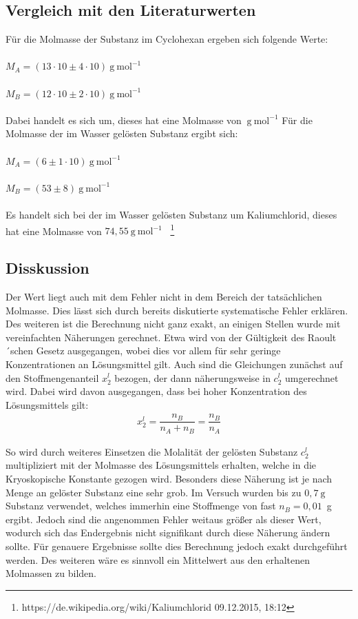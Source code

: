\documentclass[12pt,a4paper,titlepage,headinclude,bibtotoc]{scrartcl}
\begin{document}
\subsection{Vergleich mit den Literaturwerten}
Für die Molmasse der Substanz im Cyclohexan ergeben sich folgende Werte:\\\\
$M_A = (13 \cdot 10 \pm 4 \cdot 10){~} \mathrm{g{~}mol^{-1}}$\\\\
$M_B = (12 \cdot 10 \pm 2 \cdot 10){~} \mathrm{g{~}mol^{-1}}$\\\\
Dabei handelt es sich um, dieses hat eine Molmasse von ${~} \mathrm{g{~}mol^{-1}}$
Für die Molmasse der im Wasser gelösten Substanz ergibt sich:\\\\
$M_A = (6  \pm 1 \cdot 10){~} \mathrm{g{~}mol^{-1}}$\\\\
$M_B = (53 \pm 8 ){~} \mathrm{g{~}mol^{-1}}$\\\\
Es handelt sich bei der im Wasser gelösten Substanz um Kaliumchlorid, dieses hat eine Molmasse von $74,55{~} \mathrm{g{~}mol^{-1}}$ {~}\footnote{https://de.wikipedia.org/wiki/Kaliumchlorid 09.12.2015, 18:12}


\subsection{Disskussion} 
Der Wert liegt auch mit dem Fehler nicht in dem Bereich der tatsächlichen Molmasse. Dies lässt sich durch bereits diskutierte systematische Fehler erklären. Des weiteren ist die Berechnung nicht ganz exakt, an einigen Stellen wurde mit vereinfachten Näherungen gerechnet. Etwa wird von der Gültigkeit des Raoult´schen Gesetz ausgegangen, wobei dies vor allem für sehr geringe Konzentrationen an Lösungsmittel gilt. Auch sind die Gleichungen zunächst auf den Stoffmengenanteil $x_2^l$ bezogen, der dann näherungsweise in $c_2^l$ umgerechnet wird. Dabei wird davon ausgegangen, dass bei hoher Konzentration des Lösungsmittels gilt:
\begin{align}
x_2^l = \dfrac{n_B}{n_A + n_B} = \dfrac{n_B}{n_A}
\end{align}   

So wird durch weiteres Einsetzen die Molalität der gelösten Substanz $c_2^l$ multipliziert mit der Molmasse des Lösungsmittels erhalten, welche in die Kryoskopische Konstante gezogen wird. Besonders diese Näherung ist je nach Menge an gelöster Substanz eine sehr grob. Im Versuch wurden bis zu $0,7{~}\mathrm{g}$ Substanz verwendet, welches immerhin eine Stoffmenge von fast $n_B = 0,01${~}g ergibt. Jedoch sind die angenommen Fehler weitaus größer als dieser Wert, wodurch sich das Endergebnis nicht signifikant durch diese Näherung ändern sollte. Für genauere Ergebnisse sollte dies Berechnung jedoch exakt durchgeführt werden. Des weiteren wäre es sinnvoll ein Mittelwert aus den erhaltenen Molmassen zu bilden.  
 
\end{document}
